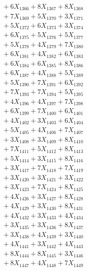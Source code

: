 \documentclass[a4paper,10pt]{article}
\begin{document}
{\begin{align}
&\;  + 6 X_{1366} + 8 X_{1367} + 8 X_{1368} \\[0.3ex]
&\;  + 7 X_{1369} + 5 X_{1370} + 3 X_{1371} \\[0.3ex]
&\;  + 5 X_{1372} + 6 X_{1373} + 3 X_{1374} \\[0.3ex]
&\;  + 6 X_{1375} + 5 X_{1376} + 5 X_{1377} \\[0.3ex]
&\;  + 5 X_{1378} + 4 X_{1379} + 7 X_{1380} \\[0.3ex]
&\;  + 6 X_{1381} + 4 X_{1382} + 6 X_{1383} \\[0.3ex]
&\;  + 6 X_{1384} + 6 X_{1385} + 8 X_{1386} \\[0.3ex]
&\;  + 6 X_{1387} + 4 X_{1388} + 5 X_{1389} \\[0.5ex]\allowbreak
&\;  + 5 X_{1390} + 7 X_{1391} + 6 X_{1392} \\[0.3ex]
&\;  + 7 X_{1393} + 7 X_{1394} + 5 X_{1395} \\[0.3ex]
&\;  + 4 X_{1396} + 4 X_{1397} + 7 X_{1398} \\[0.3ex]
&\;  + 6 X_{1399} + 7 X_{1400} + 6 X_{1401} \\[0.3ex]
&\;  + 4 X_{1402} + 3 X_{1403} + 6 X_{1404} \\[0.3ex]
&\;  + 5 X_{1405} + 4 X_{1406} + 7 X_{1407} \\[0.3ex]
&\;  + 3 X_{1408} + 3 X_{1409} + 8 X_{1410} \\[0.3ex]
&\;  + 7 X_{1411} + 5 X_{1412} + 8 X_{1413} \\[0.3ex]
&\;  + 5 X_{1414} + 3 X_{1415} + 8 X_{1416} \\[0.3ex]
&\;  + 3 X_{1417} + 7 X_{1418} + 7 X_{1419} \\[0.5ex]\allowbreak
&\;  + 3 X_{1420} + 3 X_{1421} + 3 X_{1422} \\[0.3ex]
&\;  + 3 X_{1423} + 7 X_{1424} + 8 X_{1425} \\[0.3ex]
&\;  + 4 X_{1426} + 3 X_{1427} + 8 X_{1428} \\[0.3ex]
&\;  + 4 X_{1429} + 3 X_{1430} + 8 X_{1431} \\[0.3ex]
&\;  + 4 X_{1432} + 3 X_{1433} + 4 X_{1434} \\[0.3ex]
&\;  + 3 X_{1435} + 3 X_{1436} + 8 X_{1437} \\[0.3ex]
&\;  + 3 X_{1438} + 4 X_{1439} + 3 X_{1440} \\[0.3ex]
&\;  + 4 X_{1441} + 3 X_{1442} + 4 X_{1443} \\[0.3ex]
&\;  + 8 X_{1444} + 8 X_{1445} + 3 X_{1446} \\[0.3ex]
&\;  + 8 X_{1447} + 4 X_{1448} + 7 X_{1449} \\[0.5ex]\allowbreak

\end{align}}
\end{document}
